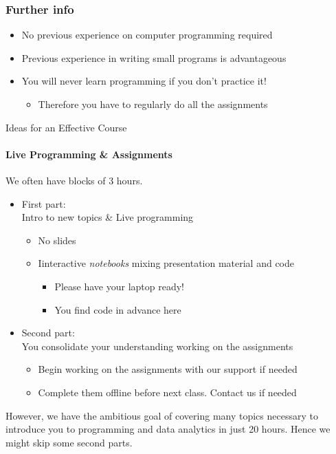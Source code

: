 \documentclass{beamer}%
\begin{document}
\begin{frame}
\frametitle{Further info}
\begin{itemize}
\item No previous experience on computer programming required
\item Previous experience in writing small programs is advantageous
\pause
\item You will never learn  programming if you don't practice it!
\begin{itemize}
\item \color{red}Therefore you have to regularly do all the assignments
\end{itemize}
\end{itemize}
\end{frame}


\begin{frame}{Ideas for an Effective Course} 
\framesubtitle{Live Programming \& Assignments}
We often have blocks of 3 hours.
\begin{itemize}
\item First part: %
\\ Intro to new topics \& Live programming
    \begin{itemize}
    \item No slides
    \item Iinteractive \emph{notebooks} mixing presentation material and code %
      \begin{itemize}
      \item Please have your laptop ready! \myurl{\homepagesetup}
	  \item You find code in advance here %
      \end{itemize}
    \end{itemize}


\item Second part: %
\\ You consolidate your understanding working on the assignments
\begin{itemize}
\item Begin working on the assignments with our support if needed
\item Complete them offline before next class. Contact us if needed
\end{itemize}
\end{itemize}
\pause
{\color{red}
However, we have the ambitious goal of covering many topics necessary to introduce you to programming and data analytics in just 20 hours. Hence we might skip some second parts.
}
\end{frame}
\end{document}
